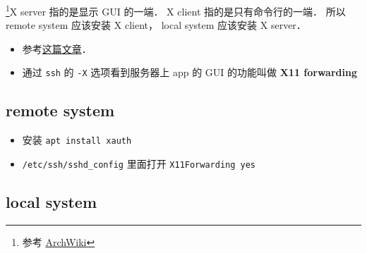 
\begin{issues}
\issueDraft
\end{issues}

\footnote{参考 \href{https://wiki.archlinux.org/title/xorg}{ArchWiki}}X server 指的是显示 GUI 的一端． X client 指的是只有命令行的一端． 所以 remote system 应该安装 X client， local system 应该安装 X server．

\begin{itemize}
\item 参考\href{https://ostechnix.com/how-to-configure-x11-forwarding-using-ssh-in-linux/}{这篇文章}．
\item 通过 \verb|ssh| 的 \verb|-X| 选项看到服务器上 app 的 GUI 的功能叫做 \textbf{X11 forwarding}
\end{itemize}


\subsection{remote system}
\begin{itemize}
\item 安装 \verb|apt install xauth|
\item \verb|/etc/ssh/sshd_config| 里面打开 \verb|X11Forwarding yes|
\end{itemize}


\subsection{local system}
